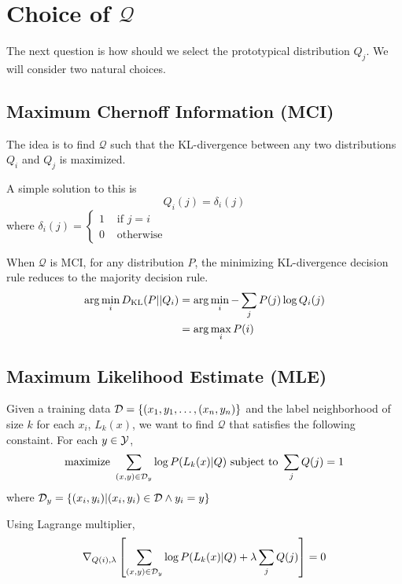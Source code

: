 \documentclass{article}
\begin{document}
\section{Choice of $\mathcal{Q}$}

The next question is how should we select the prototypical
distribution $Q_j$. We will consider two natural choices. 

\subsection{Maximum Chernoff Information (MCI)}
The idea is to find $\mathcal{Q}$ such that the KL-divergence between
any two distributions $Q_i$ and $Q_j$ is maximized.

A simple solution to this is
\[
Q_i(j) = \delta_i(j)
\]
where $\delta_i(j) = \begin{cases} 1 &\mbox{ if } j = i\\ 0 &\mbox{ otherwise} \end{cases}$

When $\mathcal{Q}$ is MCI, for any distribution $P$, the minimizing
KL-divergence decision rule reduces to the majority decision rule.
\begin{align*}
\arg\min_i D_{\mathrm{KL}}(P||Q_i) &= \arg\min_i -\sum_{j} P(j) \log Q_i(j)\\
 &= \arg\max_i P(i)\\
\end{align*}


\subsection{Maximum Likelihood Estimate (MLE)}

Given a training data $\mathcal{D} = \{(x_1,y_1,\ldots,(x_n,y_n)\}$ and the
label neighborhood of size $k$ for each $x_i$, $L_k(x)$, we want to
find $\mathcal{Q}$ that satisfies the following constaint. For each $y
\in \mathcal{Y}$, 
\[
\mbox{maximize } \sum_{(x,y) \in \mathcal{D}_y} \log P(L_k(x)|Q) \mbox{ subject to } \sum_{j} Q(j) = 1 
\]
where $\mathcal{D}_y = \{(x_i,y_i) | (x_i,y_i) \in \mathcal{D} \wedge y_i = y\}$

Using Lagrange multiplier,
\[
\nabla_{Q(i),\lambda} \left[ \sum_{(x,y) \in \mathcal{D}_y} \log P(L_k(x)|Q) + \lambda \sum_{j} Q(j) \right] = 0
\]
\end{document}
